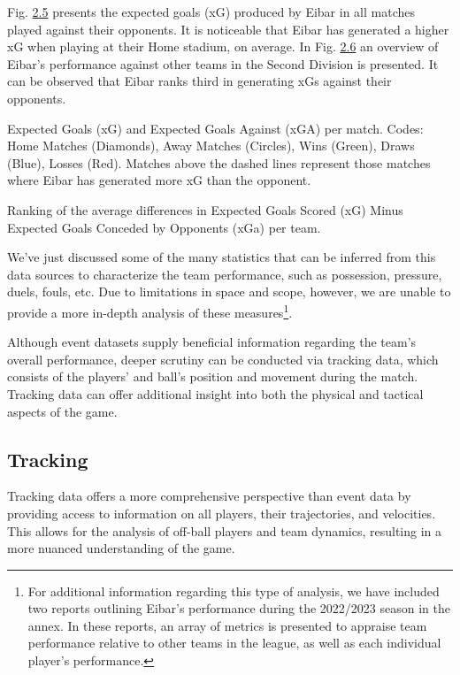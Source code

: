 \documentclass[twoside,nohyper]{tufte-book}
\begin{document}
Fig. \protect\hyperlink{f2.5}{2.5} presents the
expected goals (xG) produced by Eibar in all matches played against
their opponents. It is noticeable that Eibar has generated a higher xG
when playing at their Home stadium, on average. In Fig.
\protect\hyperlink{f2.6}{2.6} an overview of
Eibar's performance against other teams in the Second Division is
presented. It can be observed that Eibar ranks third in generating xGs
against their opponents.

Expected Goals (xG) and Expected Goals Against (xGA) per
match. Codes: Home Matches (Diamonds), Away Matches (Circles), Wins
(Green), Draws (Blue), Losses (Red). Matches above the dashed lines
represent those matches where Eibar has generated more xG than the
opponent.

Ranking of the average differences in Expected Goals Scored
(xG) Minus Expected Goals Conceded by Opponents (xGa) per
team.

We've just discussed some of the many statistics that can be inferred
from this data sources to characterize the team performance, such as
possession, pressure, duels, fouls, etc. Due to limitations in space and
scope, however, we are unable to provide a more in-depth analysis of
these measures\footnote{For additional information regarding this type of analysis, we
  have included two reports outlining Eibar's performance during the
  2022/2023 season in the annex. In these reports, an array of metrics
  is presented to appraise team performance relative to other teams in
  the league, as well as each individual player's performance.}.

Although event datasets supply beneficial information regarding the
team's overall performance, deeper scrutiny can be conducted via
tracking data, which consists of the players' and ball's position and
movement during the match. Tracking data can offer additional insight
into both the physical and tactical aspects of the game.

\hypertarget{tracking-1}{%
\subsection{Tracking}\label{tracking-1}}

Tracking data offers a more comprehensive perspective than event data by
providing access to information on all players, their trajectories, and
velocities. This allows for the analysis of off-ball players and team
dynamics, resulting in a more nuanced understanding of the game.
\end{document}
